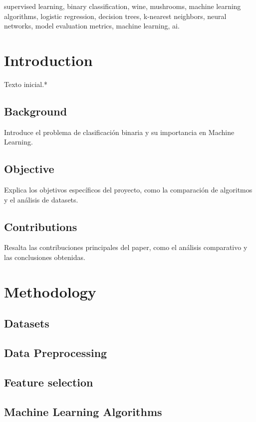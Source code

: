 \documentclass[conference]{IEEEtran}
\begin{document}
\begin{IEEEkeywords}
  supervised learning, binary classification, wine, mushrooms, machine learning algorithms, logistic regression, decision trees, k-nearest neighbors, neural networks, model evaluation metrics, machine learning, ai.
  \end{IEEEkeywords}

\section{Introduction}
Texto inicial.*

\subsection{Background}
Introduce el problema de clasificación binaria y su importancia en Machine Learning.

\subsection{Objective}
Explica los objetivos específicos del proyecto, como la comparación de algoritmos y el análisis de datasets.

\subsection{Contributions}
Resalta las contribuciones principales del paper, como el análisis comparativo y las conclusiones obtenidas.

\section{Methodology}

\subsection{Datasets}

\subsection{Data Preprocessing}

\subsection{Feature selection}

\subsection{Machine Learning Algorithms}
\end{document}
